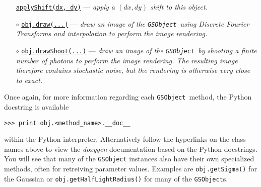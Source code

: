 \documentclass[preprint,11pt]{aastex}
\newcommand{\gsobject}{{\tt GSObject}}
\begin{document}
\begin{itemize}
  \href{http://galsim-developers.github.com/GalSim/classgalsim_1_1base_1_1_g_s_object.html#a6b547741eeec4086de9abe227dae9325}{\texttt{applyShift(dx,
      dy)}} --- \emph{apply a $(dx, dy)$ shift to this object.}
\item[$\circ$]
  \href{http://galsim-developers.github.com/GalSim/classgalsim_1_1base_1_1_g_s_object.html#ae0b346a8b438dedbc7f60a52220869d8}{\texttt{obj.draw(...)}}
  --- \emph{draw an image of the \gsobject~using Discrete Fourier
  Transforms and interpolation to perform the image rendering.}
\item[$\circ$]
  \href{http://galsim-developers.github.com/GalSim/classgalsim_1_1base_1_1_g_s_object.html#a42ac334d2840ba3fa832988e998beca0}{\texttt{obj.drawShoot(...)}}
  --- \emph{draw an image of the \gsobject~by shooting a finite number of
  photons to perform the image rendering.  The resulting image
  therefore contains stochastic noise, but the rendering is otherwise
  very close to exact.}
\end{itemize}
Once again, for more information regarding each \gsobject~method,
the Python docstring is available

{\tt >>> print obj.<method\_name>.\_\_doc\_\_}

within the Python interpreter.  Alternatively follow the hyperlinks on
the class names above to view the \emph{doxygen} documentation based
on the Python docstrings.  You will see that many of the \gsobject
instances also have their own specialized methods, often for
retreiving parameter values. Examples are \texttt{obj.getSigma()} for
the Gaussian or \texttt{obj.getHalfLightRadius()} for many of the
\gsobject s.
\end{document}
